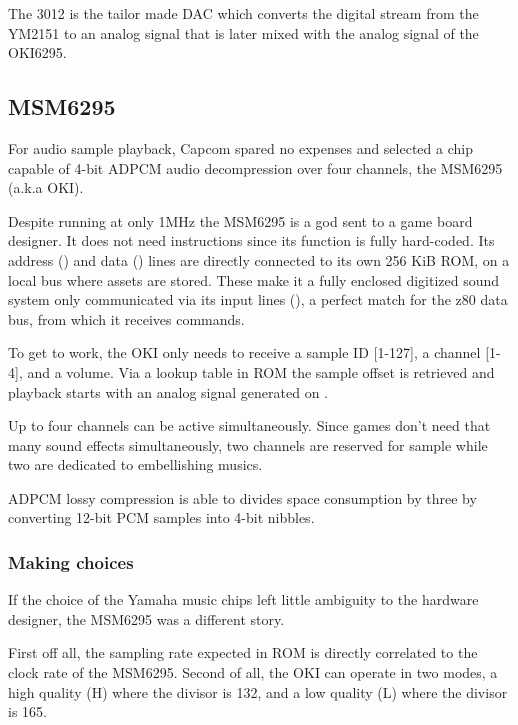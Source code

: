 The 3012 is the tailor made DAC which converts the digital stream from the YM2151 to an analog signal that is later mixed with the analog signal of the OKI6295.

\subsection{MSM6295}
For audio sample playback, Capcom spared no expenses and selected a chip capable of 4-bit ADPCM audio decompression over four channels, the MSM6295 (a.k.a OKI). 

Despite running at only 1MHz the MSM6295 is a god sent to a game board designer. It does not need instructions since its function is fully hard-coded. Its address () and data () lines are directly connected to its own 256 KiB ROM, on a local bus where assets are stored. These make it a fully enclosed digitized sound system only communicated via its input lines (), a perfect match for the z80 data bus, from which it receives commands.

To get to work, the OKI only needs to receive a sample ID [1-127], a channel [1-4], and a volume. Via a lookup table in ROM the sample offset is retrieved and playback starts with an analog signal generated on . 


Up to four channels can be active simultaneously. Since games don't need that many sound effects simultaneously, two channels are reserved for sample while two are dedicated to embellishing musics.

ADPCM lossy compression is able to divides space consumption by three by converting 12-bit PCM samples into 4-bit nibbles. 


\subsubsection{Making choices}
If the choice of the Yamaha music chips left little ambiguity to the hardware designer, the MSM6295 was a different story.

First off all, the sampling rate expected in ROM is directly correlated to the clock rate of the MSM6295. Second of all, the OKI can operate in two modes, a high quality (H) where the divisor is 132, and a low quality (L) where the divisor is 165.

